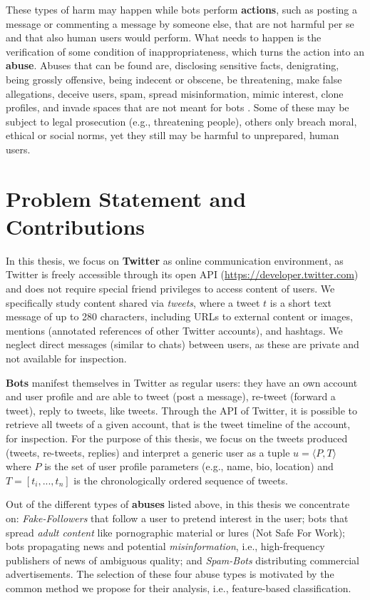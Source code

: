 These types of harm may happen while bots perform  \textbf{actions}, such as posting a message or commenting a message by someone else, that are not harmful per se and that also human users would perform. What needs to happen is the verification of some condition of inappropriateness, which turns the action into an \textbf{abuse}. Abuses that can be found are, disclosing sensitive facts, denigrating, being grossly offensive, being indecent or obscene, be threatening, make false allegations, deceive users, spam, spread misinformation, mimic interest, clone profiles, and invade spaces that are not meant for bots \cite{DanielIC2019}. Some of these may be subject to legal prosecution (e.g., threatening people), others only breach moral, ethical or social norms, yet they still may be harmful to unprepared, human users.

\section{Problem Statement and Contributions}
\label{sec:contributions}
In this thesis, we focus on \textbf{Twitter} as online communication environment, as Twitter is freely accessible through its open API (\url{https://developer.twitter.com}) and does not require special friend privileges to access content of users. We specifically study content shared via \emph{tweets}, where a tweet $t$ is a short text message of up to 280 characters, including URLs to external content or images, mentions (annotated references of other Twitter accounts), and hashtags. We neglect direct messages (similar to chats) between users, as these are private and not available for inspection. 

\textbf{Bots} manifest themselves in Twitter as regular users: they have an own account and user profile and are able to tweet (post a message), re-tweet (forward a tweet), reply to tweets, like tweets. Through the API of Twitter, it is possible to retrieve all tweets of a given account, that is the tweet timeline of the account, for inspection. For the purpose of this thesis, we focus on the tweets produced (tweets, re-tweets, replies) and interpret a generic user as a tuple $u = \langle P, T \rangle$ where $P$ is the set of 
user profile parameters (e.g., name, bio, location) and $T = [t_i,...,t_n]$ is the chronologically ordered sequence of tweets.

Out of the different types of \textbf{abuses} listed above, in this thesis we concentrate on: \emph{Fake-Followers} that follow a user to pretend interest in the user; bots that spread \emph{adult content} like pornographic material or lures (Not Safe For Work); bots propagating news and potential \emph{misinformation}, i.e., high-frequency publishers of news of ambiguous quality; and \emph{Spam-Bots} distributing commercial advertisements. The selection of these four abuse types is motivated by the common method we propose for their analysis, i.e., feature-based classification.

